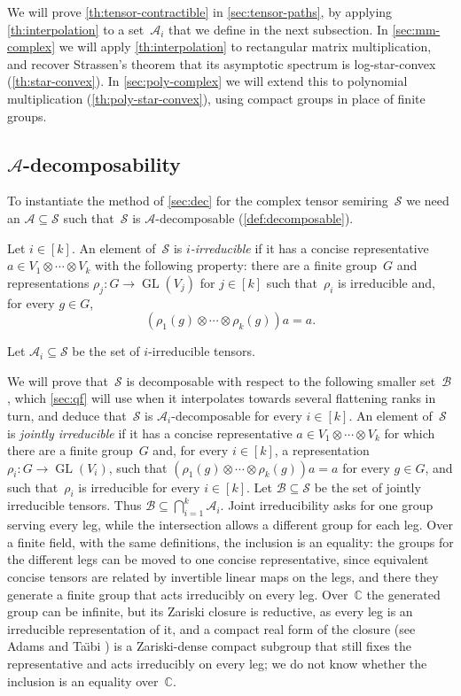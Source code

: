 \documentclass[11pt,letterpaper]{article}
\newcommand{\CC}{\mathbb{C}}
\DeclareMathOperator{\GL}{GL}
\begin{document}
We will prove \cref{th:tensor-contractible} in \cref{sec:tensor-paths}, by applying \cref{th:interpolation} to a set~$\mathcal{A}_i$ that we define in the next subsection. In \cref{sec:mm-complex} we will apply \cref{th:interpolation} to rectangular matrix multiplication, and recover Strassen's theorem that its asymptotic spectrum is log-star-convex (\cref{th:star-convex}). In \cref{sec:poly-complex} we will extend this to polynomial multiplication (\cref{th:poly-star-convex}), using compact groups in place of finite groups.

\subsection{\texorpdfstring{$\mathcal{A}$}{A}-decomposability}

To instantiate the method of \cref{sec:dec} for the complex tensor semiring~$\mathcal{S}$ we need an $\mathcal{A}\subseteq \mathcal{S}$ such that~$\mathcal{S}$ is $\mathcal{A}$-decomposable (\cref{def:decomposable}).

Let $i \in [k]$. An element of~$\mathcal{S}$ is \emph{$i$-irreducible} if it has a concise representative $a \in V_1 \otimes \cdots \otimes V_k$ with the following property: there are a finite group~$G$ and representations $\rho_j : G \to \GL(V_j)$ for $j \in [k]$ such that~$\rho_i$ is irreducible and, for every $g \in G$,
\[
(\rho_1(g) \otimes \cdots \otimes \rho_k(g)) a = a.
\]

Let $\mathcal{A}_i \subseteq \mathcal{S}$ be the set of $i$-irreducible tensors. 

We will prove that~$\mathcal{S}$ is decomposable with respect to the following smaller set~$\mathcal{B}$, which \cref{sec:qf} will use when it interpolates towards several flattening ranks in turn, and deduce that~$\mathcal{S}$ is $\mathcal{A}_i$-decomposable for every $i \in [k]$. An element of~$\mathcal{S}$ is \emph{jointly irreducible} if it has a concise representative $a \in V_1 \otimes \cdots \otimes V_k$ for which there are a finite group~$G$ and, for every $i \in [k]$, a representation $\rho_i : G \to \GL(V_i)$, such that $(\rho_1(g) \otimes \cdots \otimes \rho_k(g)) a = a$ for every $g \in G$, and such that~$\rho_i$ is irreducible for every $i \in [k]$. Let $\mathcal{B} \subseteq \mathcal{S}$ be the set of jointly irreducible tensors. Thus $\mathcal{B} \subseteq \bigcap_{i=1}^k \mathcal{A}_i$. Joint irreducibility asks for one group serving every leg, while the intersection allows a different group for each leg. Over a finite field, with the same definitions, the inclusion is an equality: the groups for the different legs can be moved to one concise representative, since equivalent concise tensors are related by invertible linear maps on the legs, and there they generate a finite group that acts irreducibly on every leg. Over~$\CC$ the generated group can be infinite, but its Zariski closure is reductive, as every leg is an irreducible representation of it, and a compact real form of the closure (see Adams and Ta\"{\i}bi \cite[Definition~3.3, Lemma~3.6 and Theorem~3.7]{MR3786301}) is a Zariski-dense compact subgroup that still fixes the representative and acts irreducibly on every leg; we do not know whether the inclusion is an equality over~$\CC$.
\end{document}
